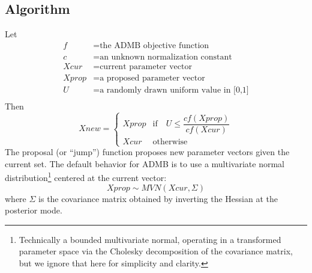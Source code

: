 \documentclass{article}\usepackage[]{graphicx}\usepackage[]{color}
\begin{document}
\subsection{Algorithm}
Let
\begin{align*}
  f&=\text{the ADMB objective function}\\
  c&=\text{an unknown normalization constant}\\
  Xcur&=\text{current parameter vector}\\
  Xprop&=\text{a proposed parameter vector}\\
  U&=\text{a randomly drawn uniform value in [0,1]}\\
\end{align*}
Then
\begin{equation}
  Xnew=
  \begin{cases}
    Xprop & \text{if} \quad U\leq \dfrac{cf(Xprop)}{cf(Xcur)}\\
    Xcur & \text{otherwise}
  \end{cases}
\end{equation}
The proposal (or ``jump'') function proposes new parameter
vectors given the current set. The default behavior for ADMB
is to use a multivariate normal
distribution\footnote{Technically a bounded multivariate
  normal, operating in a transformed parameter space via the
  Cholesky decomposition of the covariance matrix, but we
  ignore that here for simplicity and clarity.} centered at
the current vector:
\begin{equation*}
  Xprop\sim MVN(Xcur, \Sigma)
\end{equation*}
 where $\Sigma$ is the covariance matrix obtained by
 inverting the Hessian at the posterior mode.
\end{document}

